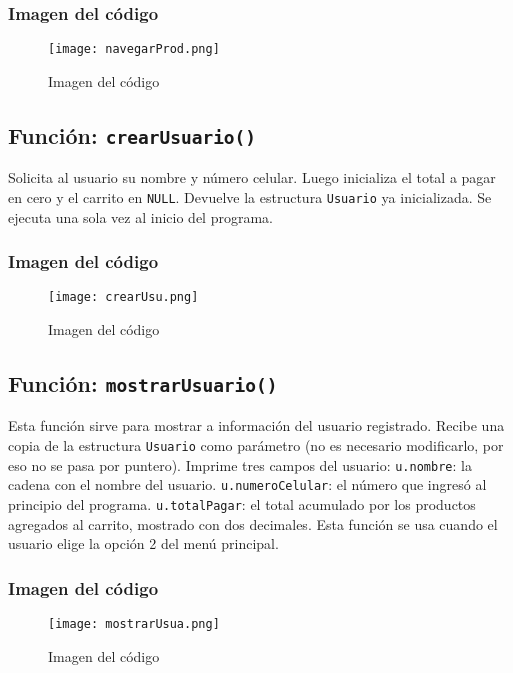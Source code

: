 \documentclass{article}
\begin{document}
   \subsubsection{Imagen del código}
   
\begin{figure}[!ht]
\centering
\texttt{[image: navegarProd.png]}
\caption{Imagen del código}
\end{figure}
   
   \pagebreak
   \subsection{Función: \texttt{crearUsuario()}}
   Solicita al usuario su nombre y número celular. Luego inicializa el total a pagar en cero y el carrito en \texttt{NULL}. Devuelve la estructura \texttt{Usuario} ya inicializada. Se ejecuta una sola vez al inicio del programa.

   \subsubsection{Imagen del código}
   
\begin{figure}[!ht]
\centering
\texttt{[image: crearUsu.png]}
\caption{Imagen del código}
\end{figure}

   \subsection{Función: \texttt{mostrarUsuario()}}
   Esta función sirve para mostrar a información del usuario registrado. Recibe una copia de la estructura \texttt{Usuario} como parámetro (no es necesario modificarlo, por eso no se pasa por puntero). Imprime tres campos del usuario: \texttt{u.nombre}: la cadena con el nombre del usuario. \texttt{u.numeroCelular}: el número que ingresó al principio del programa. \texttt{u.totalPagar}: el total acumulado por los productos agregados al carrito, mostrado con dos decimales. Esta función se usa cuando el usuario elige la opción 2 del menú principal.

   \subsubsection{Imagen del código}
   
\begin{figure}[!ht]
\centering
\texttt{[image: mostrarUsua.png]}
\caption{Imagen del código}
\end{figure}
\end{document}
